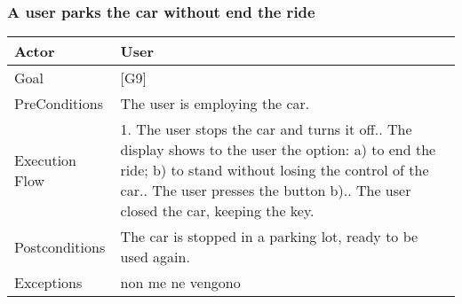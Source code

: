 \documentclass{article}
\begin{document}
	\subsubsection{A user parks the car without end the ride}
	\begin{tabularx}{\textwidth}{  l  X  }
		\hline
		Actor & User\\
		\hline
		Goal & [G9]\\
		\hline
		PreConditions & The user is employing the car.\\
		\hline
		Execution Flow & 1. The user stops the car and turns it off.\newline
										 2. The display shows to the user the option:\newline\tab
										 					a) to end the ride;\newline\tab
															b) to stand without losing the control of the car.\newline
										 3. The user presses the button b).\newline
										 4. The user closed the car, keeping the key.\\
		\hline
		Postconditions & The car is stopped in a parking lot, ready to be used again.\\
		\hline
		Exceptions & non me ne vengono\\
		\hline
	\end{tabularx}
\end{document}
